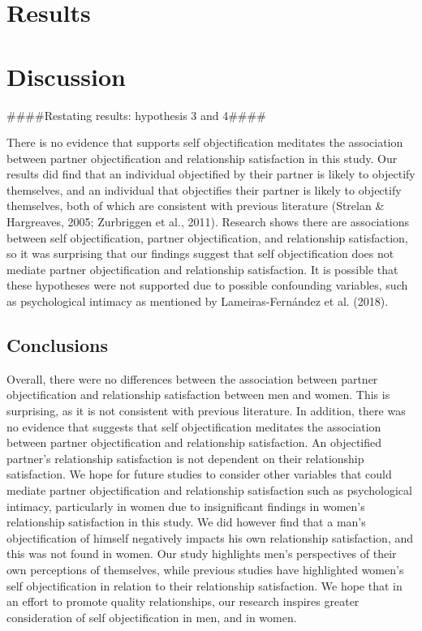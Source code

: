 \documentclass[
  man]{apa6}
\begin{document}
\hypertarget{results}{%
\section{Results}\label{results}}

\hypertarget{discussion}{%
\section{Discussion}\label{discussion}}

\#\#\#\#Restating results: hypothesis 3 and 4\#\#\#\#

There is no evidence that supports self objectification meditates the association between partner objectification and relationship satisfaction in this study. Our results did find that an individual objectified by their partner is likely to objectify themselves, and an individual that objectifies their partner is likely to objectify themselves, both of which are consistent with previous literature (Strelan \& Hargreaves, 2005; Zurbriggen et al., 2011). Research shows there are associations between self objectification, partner objectification, and relationship satisfaction, so it was surprising that our findings suggest that self objectification does not mediate partner objectification and relationship satisfaction. It is possible that these hypotheses were not supported due to possible confounding variables, such as psychological intimacy as mentioned by Lameiras-Fernández et al. (2018).

\hypertarget{conclusions}{%
\subsection{Conclusions}\label{conclusions}}

Overall, there were no differences between the association between partner objectification and relationship satisfaction between men and women. This is surprising, as it is not consistent with previous literature. In addition, there was no evidence that suggests that self objectification meditates the association between partner objectification and relationship satisfaction. An objectified partner's relationship satisfaction is not dependent on their relationship satisfaction. We hope for future studies to consider other variables that could mediate partner objectification and relationship satisfaction such as psychological intimacy, particularly in women due to insignificant findings in women's relationship satisfaction in this study. We did however find that a man's objectification of himself negatively impacts his own relationship satisfaction, and this was not found in women. Our study highlights men's perspectives of their own perceptions of themselves, while previous studies have highlighted women's self objectification in relation to their relationship satisfaction. We hope that in an effort to promote quality relationships, our research inspires greater consideration of self objectification in men, and in women.
\end{document}
